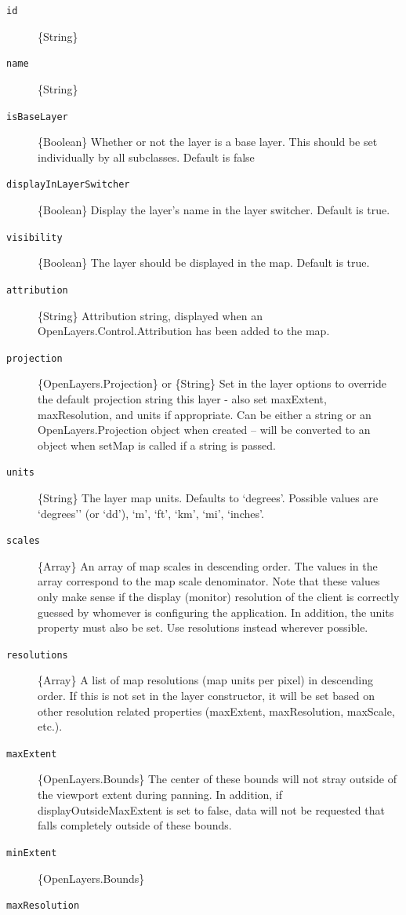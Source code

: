 \documentclass[]{article}
\begin{document}
\begin{description}
\item[\texttt{id}]
\{String\}
\item[\texttt{name}]
\{String\}
\item[\texttt{isBaseLayer}]
\{Boolean\} Whether or not the layer is a base layer. This should be set
individually by all subclasses. Default is false
\item[\texttt{displayInLayerSwitcher}]
\{Boolean\} Display the layer's name in the layer switcher. Default is
true.
\item[\texttt{visibility}]
\{Boolean\} The layer should be displayed in the map. Default is true.
\item[\texttt{attribution}]
\{String\} Attribution string, displayed when an
OpenLayers.Control.Attribution has been added to the map.
\item[\texttt{projection}]
\{OpenLayers.Projection\} or \{String\} Set in the layer options to
override the default projection string this layer - also set maxExtent,
maxResolution, and units if appropriate. Can be either a string or an
OpenLayers.Projection object when created -- will be converted to an
object when setMap is called if a string is passed.
\item[\texttt{units}]
\{String\} The layer map units. Defaults to `degrees'. Possible values
are `degrees'' (or `dd'), `m', `ft', `km', `mi', `inches'.
\item[\texttt{scales}]
\{Array\} An array of map scales in descending order. The values in the
array correspond to the map scale denominator. Note that these values
only make sense if the display (monitor) resolution of the client is
correctly guessed by whomever is configuring the application. In
addition, the units property must also be set. Use resolutions instead
wherever possible.
\item[\texttt{resolutions}]
\{Array\} A list of map resolutions (map units per pixel) in descending
order. If this is not set in the layer constructor, it will be set based
on other resolution related properties (maxExtent, maxResolution,
maxScale, etc.).
\item[\texttt{maxExtent}]
\{OpenLayers.Bounds\} The center of these bounds will not stray outside
of the viewport extent during panning. In addition, if
displayOutsideMaxExtent is set to false, data will not be requested that
falls completely outside of these bounds.
\item[\texttt{minExtent}]
\{OpenLayers.Bounds\}
\item[\texttt{maxResolution}]

\end{description}
\end{document}
